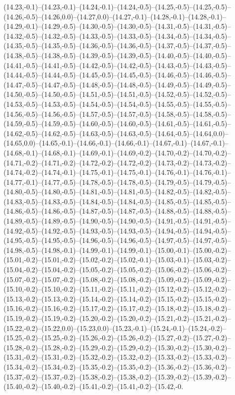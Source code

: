 (14.23,-0.1)--(14.23,-0.1)--(14.24,-0.1)--(14.24,-0.5)--(14.25,-0.5)--(14.25,-0.5)--(14.26,-0.5)--(14.26,0.0)--(14.27,0.0)--(14.27,-0.1)--(14.28,-0.1)--(14.28,-0.1)--(14.29,-0.1)--(14.29,-0.5)--(14.30,-0.5)--(14.30,-0.5)--(14.31,-0.5)--(14.31,-0.5)--(14.32,-0.5)--(14.32,-0.5)--(14.33,-0.5)--(14.33,-0.5)--(14.34,-0.5)--(14.34,-0.5)--(14.35,-0.5)--(14.35,-0.5)--(14.36,-0.5)--(14.36,-0.5)--(14.37,-0.5)--(14.37,-0.5)--(14.38,-0.5)--(14.38,-0.5)--(14.39,-0.5)--(14.39,-0.5)--(14.40,-0.5)--(14.40,-0.5)--(14.41,-0.5)--(14.41,-0.5)--(14.42,-0.5)--(14.42,-0.5)--(14.43,-0.5)--(14.43,-0.5)--(14.44,-0.5)--(14.44,-0.5)--(14.45,-0.5)--(14.45,-0.5)--(14.46,-0.5)--(14.46,-0.5)--(14.47,-0.5)--(14.47,-0.5)--(14.48,-0.5)--(14.48,-0.5)--(14.49,-0.5)--(14.49,-0.5)--(14.50,-0.5)--(14.50,-0.5)--(14.51,-0.5)--(14.51,-0.5)--(14.52,-0.5)--(14.52,-0.5)--(14.53,-0.5)--(14.53,-0.5)--(14.54,-0.5)--(14.54,-0.5)--(14.55,-0.5)--(14.55,-0.5)--(14.56,-0.5)--(14.56,-0.5)--(14.57,-0.5)--(14.57,-0.5)--(14.58,-0.5)--(14.58,-0.5)--(14.59,-0.5)--(14.59,-0.5)--(14.60,-0.5)--(14.60,-0.5)--(14.61,-0.5)--(14.61,-0.5)--(14.62,-0.5)--(14.62,-0.5)--(14.63,-0.5)--(14.63,-0.5)--(14.64,-0.5)--(14.64,0.0)--(14.65,0.0)--(14.65,-0.1)--(14.66,-0.1)--(14.66,-0.1)--(14.67,-0.1)--(14.67,-0.1)--(14.68,-0.1)--(14.68,-0.1)--(14.69,-0.1)--(14.69,-0.2)--(14.70,-0.2)--(14.70,-0.2)--(14.71,-0.2)--(14.71,-0.2)--(14.72,-0.2)--(14.72,-0.2)--(14.73,-0.2)--(14.73,-0.2)--(14.74,-0.2)--(14.74,-0.1)--(14.75,-0.1)--(14.75,-0.1)--(14.76,-0.1)--(14.76,-0.1)--(14.77,-0.1)--(14.77,-0.5)--(14.78,-0.5)--(14.78,-0.5)--(14.79,-0.5)--(14.79,-0.5)--(14.80,-0.5)--(14.80,-0.5)--(14.81,-0.5)--(14.81,-0.5)--(14.82,-0.5)--(14.82,-0.5)--(14.83,-0.5)--(14.83,-0.5)--(14.84,-0.5)--(14.84,-0.5)--(14.85,-0.5)--(14.85,-0.5)--(14.86,-0.5)--(14.86,-0.5)--(14.87,-0.5)--(14.87,-0.5)--(14.88,-0.5)--(14.88,-0.5)--(14.89,-0.5)--(14.89,-0.5)--(14.90,-0.5)--(14.90,-0.5)--(14.91,-0.5)--(14.91,-0.5)--(14.92,-0.5)--(14.92,-0.5)--(14.93,-0.5)--(14.93,-0.5)--(14.94,-0.5)--(14.94,-0.5)--(14.95,-0.5)--(14.95,-0.5)--(14.96,-0.5)--(14.96,-0.5)--(14.97,-0.5)--(14.97,-0.5)--(14.98,-0.5)--(14.98,-0.1)--(14.99,-0.1)--(14.99,-0.1)--(15.00,-0.1)--(15.00,-0.2)--(15.01,-0.2)--(15.01,-0.2)--(15.02,-0.2)--(15.02,-0.1)--(15.03,-0.1)--(15.03,-0.2)--(15.04,-0.2)--(15.04,-0.2)--(15.05,-0.2)--(15.05,-0.2)--(15.06,-0.2)--(15.06,-0.2)--(15.07,-0.2)--(15.07,-0.2)--(15.08,-0.2)--(15.08,-0.2)--(15.09,-0.2)--(15.09,-0.2)--(15.10,-0.2)--(15.10,-0.2)--(15.11,-0.2)--(15.11,-0.2)--(15.12,-0.2)--(15.12,-0.2)--(15.13,-0.2)--(15.13,-0.2)--(15.14,-0.2)--(15.14,-0.2)--(15.15,-0.2)--(15.15,-0.2)--(15.16,-0.2)--(15.16,-0.2)--(15.17,-0.2)--(15.17,-0.2)--(15.18,-0.2)--(15.18,-0.2)--(15.19,-0.2)--(15.19,-0.2)--(15.20,-0.2)--(15.20,-0.2)--(15.21,-0.2)--(15.21,-0.2)--(15.22,-0.2)--(15.22,0.0)--(15.23,0.0)--(15.23,-0.1)--(15.24,-0.1)--(15.24,-0.2)--(15.25,-0.2)--(15.25,-0.2)--(15.26,-0.2)--(15.26,-0.2)--(15.27,-0.2)--(15.27,-0.2)--(15.28,-0.2)--(15.28,-0.2)--(15.29,-0.2)--(15.29,-0.2)--(15.30,-0.2)--(15.30,-0.2)--(15.31,-0.2)--(15.31,-0.2)--(15.32,-0.2)--(15.32,-0.2)--(15.33,-0.2)--(15.33,-0.2)--(15.34,-0.2)--(15.34,-0.2)--(15.35,-0.2)--(15.35,-0.2)--(15.36,-0.2)--(15.36,-0.2)--(15.37,-0.2)--(15.37,-0.2)--(15.38,-0.2)--(15.38,-0.2)--(15.39,-0.2)--(15.39,-0.2)--(15.40,-0.2)--(15.40,-0.2)--(15.41,-0.2)--(15.41,-0.2)--(15.42,-0.